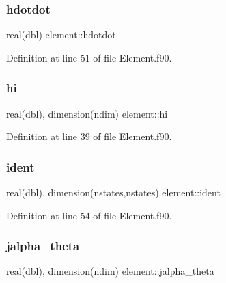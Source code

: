 \subsubsection{\texorpdfstring{hdotdot}{hdotdot}}
{\footnotesize\ttfamily real(dbl) element\+::hdotdot\hspace{0.3cm}{\ttfamily [private]}}



Definition at line 51 of file Element.\+f90.

\mbox{\label{namespaceelement_aec782f88829f63bff819c43e9c19f02c}} 
\subsubsection{\texorpdfstring{hi}{hi}}
{\footnotesize\ttfamily real(dbl), dimension(ndim) element\+::hi\hspace{0.3cm}{\ttfamily [private]}}



Definition at line 39 of file Element.\+f90.

\mbox{\label{namespaceelement_af575d84cfbaeca87aec268f375efac06}} 
\subsubsection{\texorpdfstring{ident}{ident}}
{\footnotesize\ttfamily real(dbl), dimension(nstates,nstates) element\+::ident\hspace{0.3cm}{\ttfamily [private]}}



Definition at line 54 of file Element.\+f90.

\mbox{\label{namespaceelement_a38bfdfabd1e6c253836e6fb02c0d6784}} 
\subsubsection{\texorpdfstring{jalpha\+\_\+theta}{jalpha\_theta}}
{\footnotesize\ttfamily real(dbl), dimension(ndim) element\+::jalpha\+\_\+theta\hspace{0.3cm}{\ttfamily [private]}}



